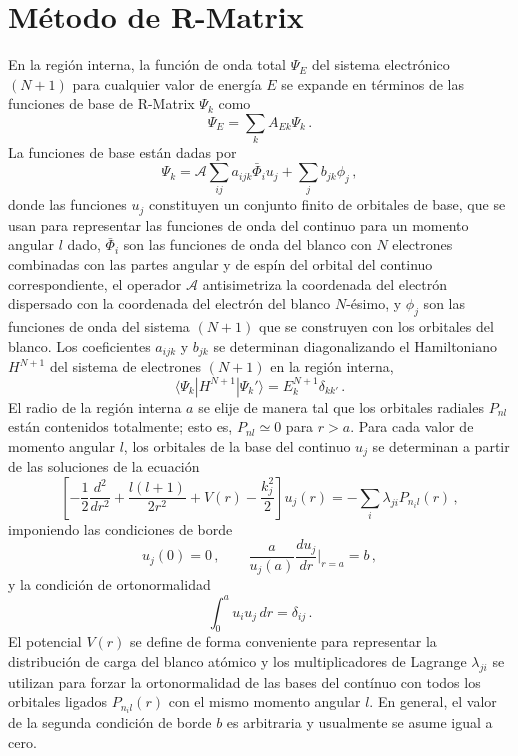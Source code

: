 \chapter{Método de R-Matrix}
\label{app:rmatrix}

En la región interna, la función de onda total $\Psi_E$ del sistema 
electrónico $(N+1)$ para cualquier valor de energía $E$ se expande en 
términos de las funciones de base de R-Matrix $\Psi_k$ como
\begin{equation}
\Psi_E=\sum_k A_{Ek}\Psi_k\,.
\label{eq:RM-wavefn}
\end{equation}
La funciones de base están dadas por
\begin{equation}
\Psi_k=\mathcal{A}\sum_{ij}a_{ijk}\bar{\Phi}_i u_j+\sum_j b_{jk}\phi_j\,,
\label{eq:RM-basisfn}
\end{equation}
donde las funciones $u_j$ constituyen un conjunto finito de orbitales de 
base, que se usan para representar las funciones de onda del continuo 
para un momento angular $l$ dado, $\bar{\Phi}_i$ son las funciones de 
onda del blanco con $N$ electrones combinadas con las partes angular y 
de espín del orbital del continuo correspondiente, el operador 
$\mathcal{A}$ antisimetriza la coordenada del electrón dispersado con la 
coordenada del electrón del blanco $N$-ésimo, y $\phi_j$ son las 
funciones de onda del sistema $(N+1)$ que se construyen con los 
orbitales del blanco. Los coeficientes $a_{ijk}$ y $b_{jk}$ se 
determinan diagonalizando el Hamiltoniano $H^{N+1}$ del sistema de 
electrones $(N+1)$ en la región interna,
\begin{equation}
\langle\Psi_k\left|H^{N+1}\right|\Psi_k'\rangle=E_k^{N+1}\delta_{kk'}\,.
\label{eq:RM-N+1Hamilt}
\end{equation}
El radio de la región interna $a$ se elije de manera tal que los 
orbitales radiales $P_{nl}$ están contenidos totalmente; esto es, 
$P_{nl}\simeq 0$ para $r>a$. Para cada valor de momento angular $l$, los 
orbitales de la base del continuo $u_j$ se determinan a partir de las 
soluciones de la ecuación
\begin{equation}
\left[-\frac{1}{2}\frac{d^2}{dr^2}+\frac{l(l+1)}{2r^2}+V(r)
-\frac{k_j^2}{2}\right]u_j(r)=-\sum_i\lambda_{ji}P_{n_il}(r)\,,
\label{eq:RM-difeq-uj}
\end{equation}
imponiendo las condiciones de borde 
\begin{equation}
u_j(0)=0\,,\qquad\frac{a}{u_j(a)}\frac{du_j}{dr}\bigg|_{r=a}=b\,,
\end{equation}
y la condición de ortonormalidad
\begin{equation}
\int_0^au_iu_j\,dr=\delta_{ij}\,.
\end{equation}
El potencial $V(r)$ se define de forma conveniente para representar la
distribución de carga del blanco atómico y los multiplicadores de 
Lagrange $\lambda_{ji}$ se utilizan para forzar la ortonormalidad de las
bases del contínuo con todos los orbitales ligados $P_{n_il}(r)$ con el
mismo momento angular $l$. En general, el valor de la segunda condición 
de borde $b$ es arbitraria y usualmente se asume igual a cero.

